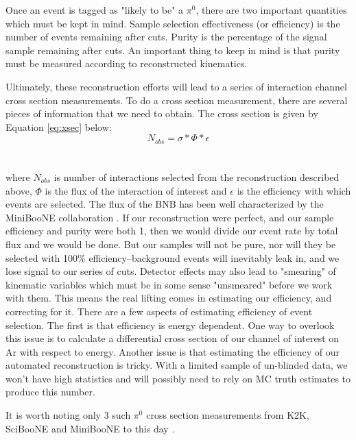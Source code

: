 \documentclass[12pt]{article}
\begin{document}
\vspace{3 mm} \par Once an event is tagged as "likely to be" a $\pi^0$, there are two important quantities which must be kept in mind. Sample selection effectiveness (or efficiency) is the number of events remaining after cuts. Purity is the percentage of the signal sample remaining after cuts. An important thing to keep in mind is that purity must be measured according to reconstructed kinematics. 
\par Ultimately, these reconstruction efforts will lead to a series of interaction channel cross section measurements.  To do a cross section measurement, there are several pieces of information that we need to obtain. The cross section is given by Equation \ref{eq:xsec} below:
\begin{equation} \label{eq:xsec}
 N_{obs} = \sigma * \Phi * \epsilon 	
\end{equation}
\\ \\ where $N_{obs}$ is number of interactions selected from the reconstruction described above, $\Phi$ is the flux of the interaction of interest and $\epsilon$ is the efficiency with which events are selected.  The flux of the BNB has been well characterized by the MiniBooNE collaboration \cite{miniboone}. If our reconstruction were perfect, and our sample efficiency and purity were both 1, then we would divide our event rate by total flux and we would be done. But our samples will not be pure, nor will they be selected with 100\% efficiency--background events will inevitably leak in, and we lose signal to our series of cuts. Detector effects may also lead to "smearing" of kinematic variables which must be in some sense "unsmeared" before we work with them.  This means the real lifting comes in estimating our efficiency, and correcting for it. There are a few aspects of estimating efficiency of event selection.  The first is that efficiency is energy dependent.  One way to overlook this issue is to calculate a differential cross section of our channel of interest on Ar with respect to energy.  Another issue is that estimating the efficiency of our automated reconstruction is tricky.  With a limited sample of un-blinded data, we won't have high statistics and will possibly need to rely on MC truth estimates to produce this number.     
\par \vspace{3 mm}It is worth noting only 3 such $\pi^0$ cross section measurements from K2K, SciBooNE and MiniBooNE to this day \cite{k2k}\cite{sciboone}\cite{anderson}. 
\end{document}
